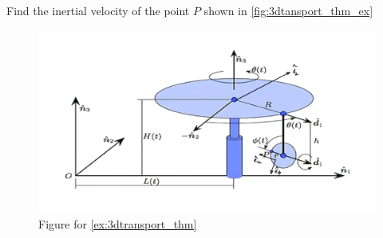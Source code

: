 \begin{example}
	\label{ex:3dtransport_thm}
	Find the inertial velocity of the point \(P\) shown in \autoref{fig:3dtansport_thm_ex}
	\begin{figure}[H]
		\centering
		\includegraphics[width=\linewidth]{figures/dynamics/3D_transport_thm_ex.png}
		\caption{Figure for \autoref{ex:3dtransport_thm}}
		\label{fig:3dtansport_thm_ex}
	\end{figure}


\end{example}
